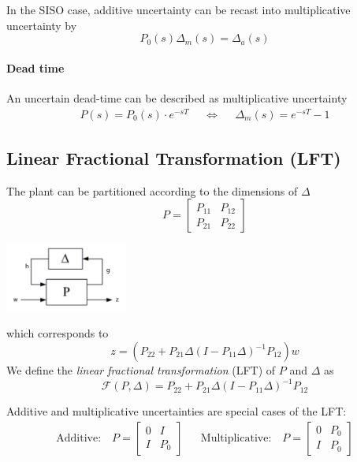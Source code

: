 In the SISO case, additive uncertainty can be recast into multiplicative
uncertainty by
\[
    P_0(s) \Delta_m(s) = \Delta_a(s)
\]

\paragraph{Dead time}An uncertain dead-time can be described as multiplicative uncertainty
\begin{align*}
    P(s) = P_0(s) \cdot e^{-sT} && \Leftrightarrow && \Delta_m(s) = e^{-sT} - 1
\end{align*}

\subsection{Linear Fractional Transformation (LFT)}
\begin{minipage}{12cm}
    The plant can be partitioned according to the dimensions of $\Delta$
    \[
        P = \begin{bmatrix}
            P_{11} & P_{12} \\
            P_{21} & P_{22}
        \end{bmatrix}
    \]
\end{minipage}
\hspace{0.5cm}
\begin{minipage}{6cm}
    \centering
    \includegraphics[width=4cm]{bilder/rob_lft.png}
\end{minipage}

which corresponds to
\[
    z = \left( P_{22} + P_{21} \Delta(I-P_{11}\Delta)^{-1} P_{12} \right) w
\]
We define the \emph{linear fractional transformation} (LFT) of $P$ and $\Delta$ as
\[
    \mathcal{F}(P,\Delta) = P_{22} + P_{21} \Delta (I-P_{11}\Delta)^{-1} P_{12}
\]

Additive and multiplicative uncertainties are special cases of the LFT:
\begin{align*}
    \text{Additive:} \quad
    P = \begin{bmatrix}
        0 & I \\ I & P_0
    \end{bmatrix}
    &&
    \text{Multiplicative:} \quad
    P = \begin{bmatrix}
        0 & P_0 \\ I & P_0
    \end{bmatrix}
\end{align*}

